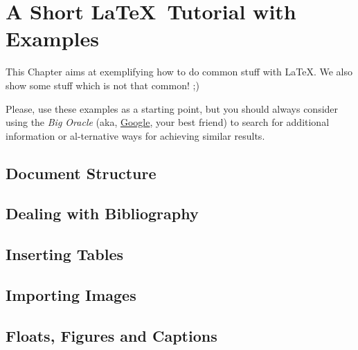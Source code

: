

\chapter{A Short \LaTeX\ Tutorial with Examples}
\label{cha:a_short_latex_tutorial_with_examples}

This Chapter aims at exemplifying how to do common stuff with \LaTeX. We also show some stuff which is not that common! ;)

Please, use these examples as a starting point, but you should always consider using the \emph{Big Oracle} (aka, \href{http://www.google.com}{Google}, your best friend) to search for additional information or al-ternative ways for achieving similar results.

\section{Document Structure} %
\label{sec:document_structure}



\section{Dealing with Bibliography} %
\label{sec:dealing_with_bibliography}



\section{Inserting Tables} %
\label{sec:inserting_tables}



\section{Importing Images} %
\label{sec:importing_images}



\section{Floats, Figures and Captions} %
\label{sec:floats_figures_and_captions}

